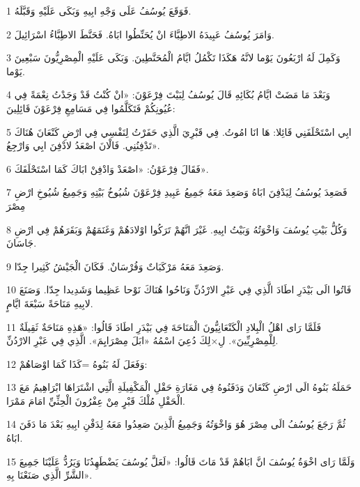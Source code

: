 \par 1 فَوَقَعَ يُوسُفُ عَلَى وَجْهِ ابِيهِ وَبَكَى عَلَيْهِ وَقَبَّلَهُ.
\par 2 وَامَرَ يُوسُفُ عَبِيدَهُ الاطِبَّاءَ انْ يُحَنِّطُوا ابَاهُ. فَحَنَّطَ الاطِبَّاءُ اسْرَائِيلَ.
\par 3 وَكَمِلَ لَهُ ارْبَعُونَ يَوْما لانَّهُ هَكَذَا تَكْمُلُ ايَّامُ الْمُحَنَّطِينَ. وَبَكَى عَلَيْهِ الْمِصْرِيُّونَ سَبْعِينَ يَوْما.
\par 4 وَبَعْدَ مَا مَضَتْ ايَّامُ بُكَائِهِ قَالَ يُوسُفُ لِبَيْتَ فِرْعَوْنَ: «انْ كُنْتُ قَدْ وَجَدْتُ نِعْمَةً فِي عُيُونِكُمْ فَتَكَلَّمُوا فِي مَسَامِعِ فِرْعَوْنَ قَائِلِينَ:
\par 5 ابِي اسْتَحْلَفَنِي قَائِلا: هَا انَا امُوتُ. فِي قَبْرِيَ الَّذِي حَفَرْتُ لِنَفْسِي فِي ارْضِ كَنْعَانَ هُنَاكَ تَدْفِنُنِي. فَالْانَ اصْعَدُ لادْفِنَ ابِي وَارْجِعُ».
\par 6 فَقَالَ فِرْعَوْنُ: «اصْعَدْ وَادْفِنْ ابَاكَ كَمَا اسْتَحْلَفَكَ».
\par 7 فَصَعِدَ يُوسُفُ لِيَدْفِنَ ابَاهُ وَصَعِدَ مَعَهُ جَمِيعُ عَبِيدِ فِرْعَوْنَ شُيُوخُ بَيْتِهِ وَجَمِيعُ شُيُوخِ ارْضِ مِصْرَ
\par 8 وَكُلُّ بَيْتِ يُوسُفَ وَاخْوَتُهُ وَبَيْتُ ابِيهِ. غَيْرَ انَّهُمْ تَرَكُوا اوْلادَهُمْ وَغَنَمَهُمْ وَبَقَرَهُمْ فِي ارْضِ جَاسَانَ.
\par 9 وَصَعِدَ مَعَهُ مَرْكَبَاتٌ وَفُرْسَانٌ. فَكَانَ الْجَيْشُ كَثِيرا جِدّا.
\par 10 فَاتُوا الَى بَيْدَرِ اطَادَ الَّذِي فِي عَبْرِ الارْدُنِّ وَنَاحُوا هُنَاكَ نَوْحا عَظِيما وَشَدِيدا جِدّا. وَصَنَعَ لابِيهِ مَنَاحَةً سَبْعَةَ ايَّامٍ.
\par 11 فَلَمَّا رَاى اهْلُ الْبِلادِ الْكَنْعَانِيُّونَ الْمَنَاحَةَ فِي بَيْدَرِ اطَادَ قَالُوا: «هَذِهِ مَنَاحَةٌ ثَقِيلَةٌ لِلْمِصْرِيِّينَ». لِ×لِكَ دُعِيَ اسْمُهُ «ابَلَ مِصْرَايِمَ». الَّذِي فِي عَبْرِ الارْدُنِّ.
\par 12 وَفَعَلَ لَهُ بَنُوهُ =كَذَا كَمَا اوْصَاهُمْ:
\par 13 حَمَلَهُ بَنُوهُ الَى ارْضِ كَنْعَانَ وَدَفَنُوهُ فِي مَغَارَةِ حَقْلِ الْمَكْفِيلَةِ الَّتِي اشْتَرَاهَا ابْرَاهِيمُ مَعَ الْحَقْلِ مُلْكَ قَبْرٍ مِنْ عِفْرُونَ الْحِثِّيِّ امَامَ مَمْرَا.
\par 14 ثُمَّ رَجَعَ يُوسُفُ الَى مِصْرَ هُوَ وَاخْوَتُهُ وَجَمِيعُ الَّذِينَ صَعِدُوا مَعَهُ لِدَفْنِ ابِيهِ بَعْدَ مَا دَفَنَ ابَاهُ.
\par 15 وَلَمَّا رَاى اخْوَةُ يُوسُفَ انَّ ابَاهُمْ قَدْ مَاتَ قَالُوا: «لَعَلَّ يُوسُفَ يَضْطَهِدُنَا وَيَرُدُّ عَلَيْنَا جَمِيعَ الشَّرِّ الَّذِي صَنَعْنَا بِهِ».
